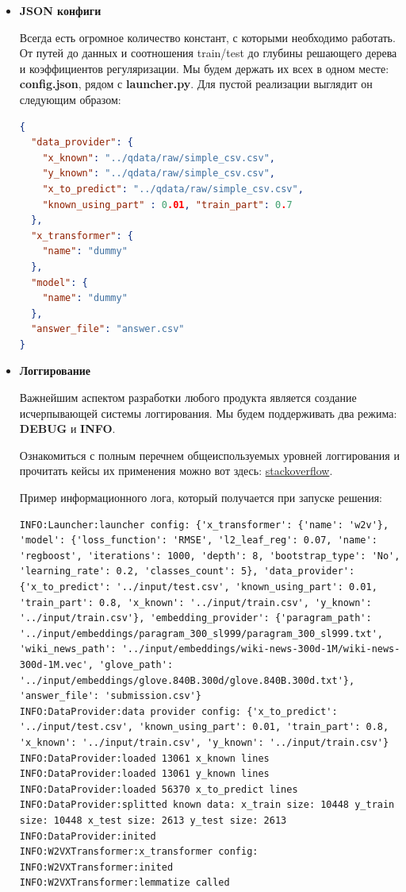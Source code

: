     \begin{itemize}
        \item \textbf{JSON конфиги}
        
     Всегда есть огромное количество констант, с которыми необходимо работать. От путей до данных и соотношения train/test до глубины решающего дерева и коэффициентов регуляризации. Мы будем держать их всех в одном месте: \textbf{config.json}, рядом с \textbf{launcher.py}. Для пустой реализации выглядит он следующим образом:
   \begin{lstlisting}[language=JSON]
{
  "data_provider": {
    "x_known": "../qdata/raw/simple_csv.csv",
    "y_known": "../qdata/raw/simple_csv.csv",
    "x_to_predict": "../qdata/raw/simple_csv.csv",
    "known_using_part" : 0.01, "train_part": 0.7
  },
  "x_transformer": {
    "name": "dummy"
  },
  "model": {
    "name": "dummy"
  },
  "answer_file": "answer.csv"
}
\end{lstlisting}

\pagebreak
    \item \textbf{Логгирование}
    
    Важнейшим аспектом разработки любого продукта является создание исчерпывающей системы логгирования. Мы будем поддерживать два режима: \textbf{DEBUG} и \textbf{INFO}.
    
    Ознакомиться с полным перечнем общеиспользуемых уровней логгирования и прочитать кейсы их применения можно вот здесь: \href{https://stackoverflow.com/questions/2031163/when-to-use-the-different-log-levels}{stackoverflow}.
    
    Пример информационного лога, который получается при запуске решения:
    \begin{lstlisting}[language=LOG]
INFO:Launcher:launcher config: {'x_transformer': {'name': 'w2v'}, 'model': {'loss_function': 'RMSE', 'l2_leaf_reg': 0.07, 'name': 'regboost', 'iterations': 1000, 'depth': 8, 'bootstrap_type': 'No', 'learning_rate': 0.2, 'classes_count': 5}, 'data_provider': {'x_to_predict': '../input/test.csv', 'known_using_part': 0.01, 'train_part': 0.8, 'x_known': '../input/train.csv', 'y_known': '../input/train.csv'}, 'embedding_provider': {'paragram_path': '../input/embeddings/paragram_300_sl999/paragram_300_sl999.txt', 'wiki_news_path': '../input/embeddings/wiki-news-300d-1M/wiki-news-300d-1M.vec', 'glove_path': '../input/embeddings/glove.840B.300d/glove.840B.300d.txt'}, 'answer_file': 'submission.csv'}
INFO:DataProvider:data provider config: {'x_to_predict': '../input/test.csv', 'known_using_part': 0.01, 'train_part': 0.8, 'x_known': '../input/train.csv', 'y_known': '../input/train.csv'}
INFO:DataProvider:loaded 13061 x_known lines
INFO:DataProvider:loaded 13061 y_known lines
INFO:DataProvider:loaded 56370 x_to_predict lines
INFO:DataProvider:splitted known data: x_train size: 10448 y_train size: 10448 x_test size: 2613 y_test size: 2613
INFO:DataProvider:inited
INFO:W2VXTransformer:x_transformer config:
INFO:W2VXTransformer:inited
INFO:W2VXTransformer:lemmatize called
\end{lstlisting}
    
	\end{itemize}
	
